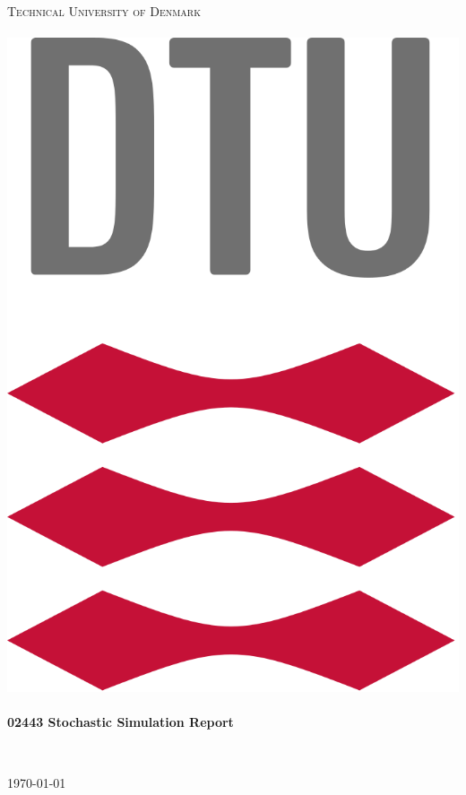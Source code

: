 \begin{titlepage}
\center

\textsc{\LARGE Technical University of Denmark}\\[0.6cm]
\textsc{\large}\\[1.0cm]

\includegraphics[scale=0.15]{figures/DTUlogo.png}\\[0.9cm]

\HRule\\[0.5cm]
{\huge \bfseries 02443 Stochastic Simulation Report}\\[0.2cm]

\HRule\\ [1cm]

\vspace{0.5cm}
\begin{minipage}{0.6\textwidth}

\begin{tabular}{l r c c c}


\hline
\end{tabular}

\end{minipage}
\vfill


\vspace{1cm}
{\large \today}\\

\vfill

\end{titlepage}